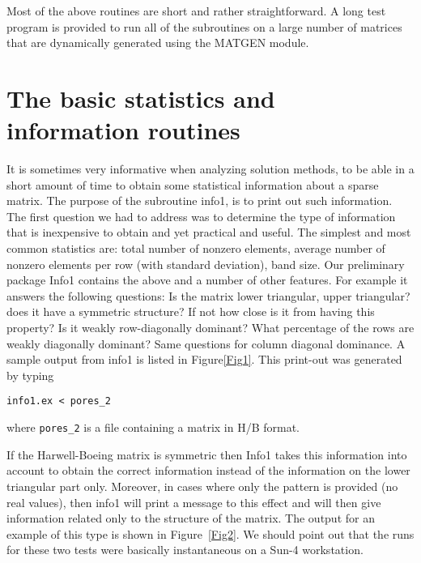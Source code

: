 

\vskip 0.3in
Most of the above routines are  short and rather straightforward.
A long test program  is provided to run all of the subroutines
on a large number of matrices that are dynamically generated
using the MATGEN module. 

\section{The basic statistics and information routines}
It is sometimes very  informative when analyzing
solution methods, to be able in a short amount of time to 
obtain some statistical information about a sparse matrix.
The purpose of the subroutine info1, is to print out such
information. The first question we had to address 
was to determine the type of information that
is inexpensive to obtain and yet practical and useful.
The simplest and most common statistics
are: total number of nonzero elements, average number of nonzero
elements per row (with standard deviation), band size.
Our preliminary package Info1 contains the above and a 
number of other features. For example it answers the following
questions: Is the matrix lower triangular, upper triangular?
does it have a symmetric structure? If not how close is it 
from having this property? Is it weakly row-diagonally dominant?
What percentage of the rows are weakly diagonally dominant?
Same questions for column diagonal dominance.
A sample output from  info1 is listed in 
Figure\ref{Fig1}. This print-out was  generated by typing 
\begin{center}
{\tt info1.ex < pores\_2}
\end{center}
where {\tt pores\_2} is a file containing a matrix in H/B format.

If the Harwell-Boeing matrix is symmetric then Info1 takes this
information into account to obtain the correct information
instead of the information on  the lower triangular part only.
Moreover, in cases where only the pattern is provided (no real
values), then info1 will print a message to this effect and 
will then give information related only to the structure of 
the matrix. The output for an example of this type is shown in 
Figure~\ref{Fig2}. We should point out that the runs for these
two tests were basically instantaneous on a Sun-4 workstation.

